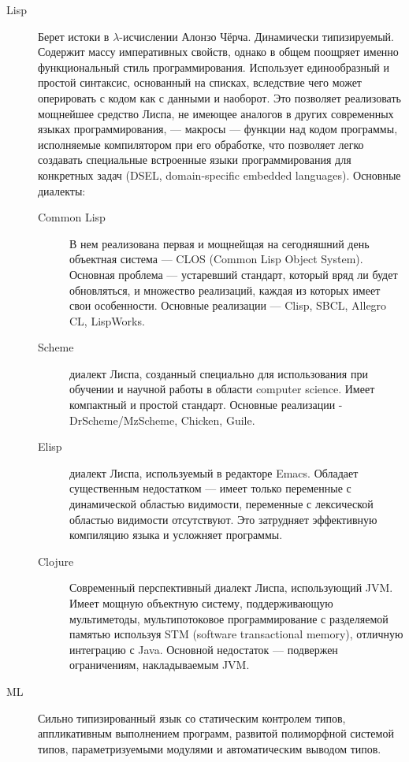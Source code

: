 \documentclass[a4paper]{article}
\begin{document}
\begin{description}
\item[Lisp] Берет истоки в $\lambda$-исчислении Алонзо Чёрча.
  Динамически типизируемый. Содержит массу императивных свойств,
  однако в общем поощряет именно функциональный стиль
  программирования. Использует единообразный и простой синтаксис,
  основанный на списках, вследствие чего может оперировать с кодом как
  с данными и наоборот. Это позволяет реализовать мощнейшее средство
  Лиспа, не имеющее аналогов в других современных языках
  программирования, --- макросы --- функции над кодом программы,
  исполняемые компилятором при его обработке, что позволяет легко
  создавать специальные встроенные языки программирования для
  конкретных задач (DSEL, domain-specific embedded languages).
  Основные диалекты:
  \begin{description}
    \item[Common Lisp] В нем реализована первая и мощнейщая на
      сегодняшний день объектная система --- CLOS (Common Lisp Object
      System). Основная проблема --- устаревший стандарт, который вряд
      ли будет обновляться, и множество реализаций, каждая из которых
      имеет свои особенности. Основные реализации --- Clisp, SBCL,
      Allegro CL, LispWorks.
    \item[Scheme] диалект Лиспа, созданный специально для
      использования при обучении и научной работы в области computer science.
      Имеет компактный и простой стандарт. Основные реализации -
      DrScheme\slash MzScheme, Chicken, Guile.
    \item[Elisp] диалект Лиспа, используемый в редакторе Emacs.
      Обладает существенным недостатком --- имеет только переменные
      с динамической областью видимости, переменные с лексической
      областью видимости отсутствуют. Это затрудняет эффективную
      компиляцию языка и усложняет программы.
    \item[Clojure] Современный перспективный диалект Лиспа,
      использующий JVM. Имеет мощную объектную систему, поддерживающую
      мультиметоды, мультипотоковое программирование с разделяемой
      памятью используя STM (software transactional memory), отличную
      интеграцию с Java. Основной недостаток --- подвержен
      ограничениям, накладываемым JVM.
  \end{description}
\item[ML] Сильно типизированный язык со статическим контролем типов,
  аппликативным выполнением программ, развитой полиморфной системой
  типов, параметризуемыми модулями и автоматическим выводом типов.

\end{description}
\end{document}
